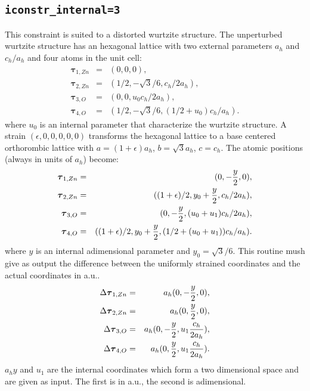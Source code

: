 \documentclass[12pt,a4paper,twoside]{report}
\begin{document}
{\color{web-blue}\subsection{\texttt{iconstr\_internal=3}}}
\color{black}
This constraint is suited to a distorted wurtzite structure. The unperturbed 
wurtzite structure has an hexagonal lattice with two external parameters
$a_h$ and $c_h/a_h$ and four atoms in the unit cell:
\begin{eqnarray}
\boldsymbol{\tau}_{1,Zn} &=& ( 0, 0, 0), \nonumber \\
\boldsymbol{\tau}_{2,Zn} &=& ( 1/2, -\sqrt{3}/6, c_h/2a_h), \nonumber \\
\boldsymbol{\tau}_{3,O} &=& ( 0, 0, u_0 c_h/2a_h), \nonumber \\
\boldsymbol{\tau}_{4,O} &=& ( 1/2, -\sqrt{3}/6, (1/2 + u_0)c_h/a_h). \nonumber 
\end{eqnarray}
where $u_0$ is an internal parameter that characterize the wurtzite
structure.
A strain $(\epsilon,0,0,0,0,0)$ transforms the hexagonal lattice to a 
base centered orthorombic lattice with $a=(1+\epsilon) a_h$,
$b = \sqrt{3} a_h$, $c = c_h$.
The atomic positions (always in units of $a_h$) become:
\begin{eqnarray}
\boldsymbol{\tau}_{1,Zn} &=& ( 0, -{y\over 2}, 0), \nonumber \\
\boldsymbol{\tau}_{2,Zn} &=& ( (1+\epsilon)/2, y_0+{y\over 2}, c_h/2a_h), \nonumber \\
\boldsymbol{\tau}_{3,O} &=& ( 0, -{y\over 2}, (u_0+u_1) c_h/2a_h), \nonumber \\
\boldsymbol{\tau}_{4,O} &=& ( (1+\epsilon)/2, y_0+{y\over 2}, (1/2 + (u_0+u_1))c_h/a_h). \nonumber 
\end{eqnarray}
where $y$ is an internal adimensional parameter and $y_0= \sqrt{3}/6$. 
This routine mush give as output the difference between the uniformly 
strained coordinates and the actual coordinates in a.u..
\begin{eqnarray}
\Delta \boldsymbol{\tau}_{1,Zn} &=& a_h ( 0, -{y\over 2}, 0), \nonumber \\
\Delta \boldsymbol{\tau}_{2,Zn} &=& a_h ( 0, {y\over 2}, 0), \nonumber \\
\Delta \boldsymbol{\tau}_{3,O} &=& a_h ( 0, -{y\over 2}, u_1 {c_h\over 2 a_h}), \nonumber \\
\Delta \boldsymbol{\tau}_{4,O} &=& a_h ( 0, {y\over 2}, u_1 {c_h \over 2 a_h}). \nonumber 
\end{eqnarray}
$a_h y$ and $u_1$ are the internal coordinates which form a two dimensional
space and are given as input. The first is in a.u., the second is adimensional.
\end{document}
